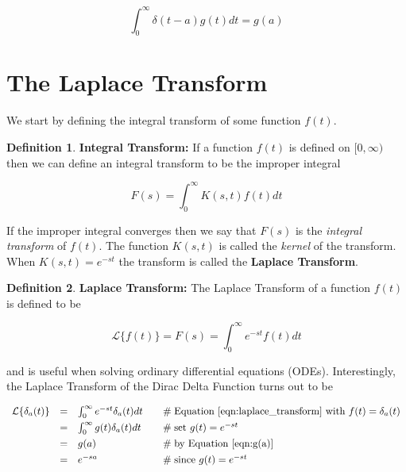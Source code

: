 \documentclass{article}
\theoremstyle{definition}
\newtheorem{definition}{Definition}[section]
\begin{document}
\bigskip
\begin{equation*}
  \int_{0}^{\infty} \delta (t-a) g(t) dt = g(a)
\end{equation*}

\bigskip
\section{The Laplace Transform}
We start by defining the integral transform of some function $f(t)$.

\bigskip
\begin{definition} 
{\bf Integral Transform:} If a function $f(t)$ is defined on $[0,\infty)$ then we can define an integral transform to be the improper integral
\end{definition}

\begin{equation*}
F(s) = \int_0^\infty K(s,t) f(t) dt
\end{equation*}

\bigskip
\noindent
If the improper integral converges then we say that $F(s)$ is the \emph{integral transform} of $f(t)$. The function $K(s,t)$ is called the \emph{kernel}
of the transform. When $K(s,t) = e^{-st}$ the transform is called the {\bf Laplace Transform}.

\bigskip
\begin{definition} 
{\bf Laplace Transform:} The Laplace Transform of a function $f(t)$ is defined to be
\label{def:laplace_transform}
\end{definition}


\begin{equation}
\mathcal{L}\{f(t)\} = F(s) = \int_0^\infty e^{-st} f(t) dt
\label{eqn:laplace_transform}
\end{equation}

\bigskip
\noindent
and is useful when solving ordinary differential equations (ODEs). Interestingly, the Laplace Transform of the Dirac Delta Function turns out to be

\bigskip
\begin{equation*}
\begin{array}{lllll}
\mathcal{L}\{\delta_a(t)\} 
&=& \int_0^\infty  e^{-st} \delta_a(t) dt    &\quad  \mathrel{\#} \text{Equation \ref{eqn:laplace_transform} with $f(t) = \delta_a(t)$}                    \\  
[4pt]                                                        %
&=& \int_0^\infty g(t) \delta_a(t) dt         &\quad  \mathrel{\#} \text{set $g(t) = e^{-st}$}                                                                                      \\
[4pt]                                                        %
&=& g(a)                                                &\quad  \mathrel{\#} \text{by Equation \ref{eqn:g(a)}}                                                                           \\
[4pt]                                                        %
&=& e^{-sa}                                            &\quad  \mathrel{\#} \text{since $g(t) = e^{-st}$}
\end{array}
\end{equation*}
\end{document}
